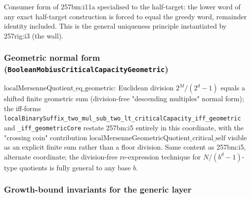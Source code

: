 \begin{prop}
Consumer form of 257bm:i11a specialised to the half-target: the lower word of any exact
half-target construction is forced to equal the greedy word, remainder identity included. This
is the general uniqueness principle instantiated by 257rig:i3 (the wall).
\par\noindent{}   
\end{prop}

\subsubsection*{Geometric normal form (\texttt{BooleanMobiusCriticalCapacityGeometric})}

\begin{thm}
$\mathrm{localMersenneQuotient\_eq\_geometric}$: Euclidean division $2^M/(2^d-1)$ equals a
shifted finite geometric sum (division-free "descending multiples" normal form); the iff-forms
\texttt{localBinarySuffix\_two\_mul\_sub\_two\_lt\_criticalCapacity\_iff\_geometric} and
\texttt{\_iff\_geometricCore} restate 257bm:i5 entirely in this coordinate, with the "crossing
coin" contribution $\mathrm{localMersenneGeometricQuotient\_critical\_self}$ visible as an
explicit finite sum rather than a floor division. Same content as 257bm:i5, alternate
coordinate; the division-free re-expression technique for $N/(b^d-1)$-type quotients is fully
general to any base $b$.
\par\noindent{}     
\end{thm}

\subsubsection*{Growth-bound invariants for the generic layer}

